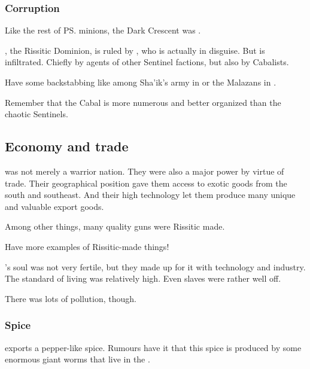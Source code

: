\subsubsection{Corruption}
Like the rest of \ps{\Secherdamon} minions, the Dark Crescent was . 

\Durcac, the Rissitic Dominion, is ruled by \HriistN, who is actually \HriistD{} in disguise. 
But \Durcac is infiltrated. 
Chiefly by agents of other Sentinel factions, but also by Cabalists. 

Have some backstabbing like among Sha'ik's army in \cite{StevenErikson:HouseofChains} or the Malazans in \cite{StevenErikson:TheBonehunters}. 

Remember that the Cabal is more numerous and better organized than the chaotic Sentinels. 





\subsection{Economy and trade}
\Durcac was not merely a warrior nation. 
They were also a major power by virtue of trade. 
Their geographical position gave them access to exotic goods from the south and southeast. 
And their high technology let them produce many unique and valuable export goods. 

Among other things, many quality guns were Rissitic made. 

Have more examples of Rissitic-made things! 

\Durcac's soul was not very fertile, but they made up for it with technology and industry. 
The standard of living was relatively high. 
Even slaves were rather well off. 

There was lots of pollution, though. 





\subsubsection{Spice}
\Durcac exports a pepper-like spice. 
Rumours have it that this spice is produced by some enormous giant worms that live in the . 









